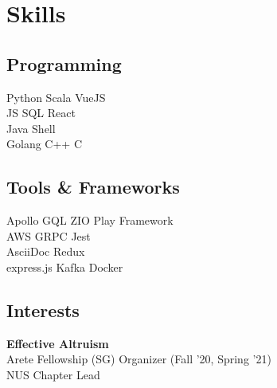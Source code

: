 \documentclass[]{deedy-resume-openfont}
\begin{document}
\begin{minipage}[t]{0.29\textwidth}

\section{Skills}
\subsection{Programming}
Python \textbullet{} Scala \textbullet{} VueJS  \\ 
JS  \textbullet{} SQL \textbullet{} React\\
\vspace{3mm}
Java\textbullet{} Shell \\ Golang \textbullet{} C++ \textbullet{} C \\
\sectionsep

\subsection{Tools \& Frameworks}
Apollo GQL \textbullet{} ZIO \textbullet{} Play Framework \\ AWS \textbullet{} GRPC \textbullet{} Jest \\ AsciiDoc \textbullet{} Redux \\ express.js \textbullet{} Kafka \textbullet{} Docker
\sectionsep

\subsection{Interests}
\textbf{Effective Altruism} \\
Arete Fellowship (SG) Organizer (Fall '20, Spring '21)\\
NUS Chapter Lead\\

%
%

\end{minipage} 
\hfill
\end{document}
